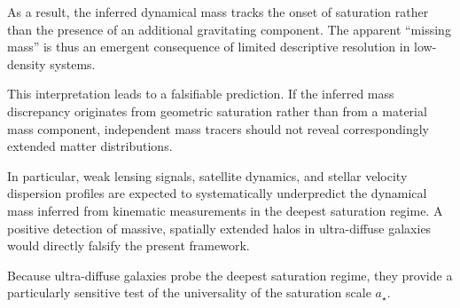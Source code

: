   As a result, the inferred dynamical mass tracks the onset of saturation rather
  than the presence of an additional gravitating component.
  The apparent ``missing mass'' is thus an emergent consequence of limited
  descriptive resolution in low-density systems.

  This interpretation leads to a falsifiable prediction.
  If the inferred mass discrepancy originates from geometric saturation rather
  than from a material mass component, independent mass tracers should not reveal
  correspondingly extended matter distributions.

  In particular, weak lensing signals, satellite dynamics, and stellar velocity
  dispersion profiles are expected to systematically underpredict the dynamical
  mass inferred from kinematic measurements in the deepest saturation regime.
  A positive detection of massive, spatially extended halos in ultra-diffuse
  galaxies would directly falsify the present framework.

  Because ultra-diffuse galaxies probe the deepest saturation regime, they
  provide a particularly sensitive test of the universality of the saturation
  scale $a_\star$.
